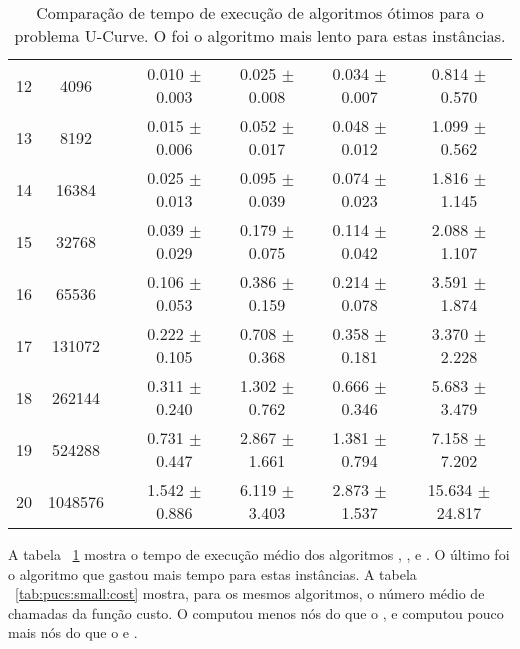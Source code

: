 \begin{table}
\begin{tabular}{cc c cccc}
12 &    4096 &&  0.010 $\pm$ 0.003 & 0.025 $\pm$ 0.008 & 0.034 $\pm$ 0.007 & 0.814 $\pm$ 0.570 \\
13 &    8192 &&  0.015 $\pm$ 0.006 & 0.052 $\pm$ 0.017 & 0.048 $\pm$ 0.012 & 1.099 $\pm$ 0.562 \\
14 &   16384 &&  0.025 $\pm$ 0.013 & 0.095 $\pm$ 0.039 & 0.074 $\pm$ 0.023 & 1.816 $\pm$ 1.145 \\
15 &   32768 &&  0.039 $\pm$ 0.029 & 0.179 $\pm$ 0.075 & 0.114 $\pm$ 0.042 & 2.088 $\pm$ 1.107 \\
16 &   65536 &&  0.106 $\pm$ 0.053 & 0.386 $\pm$ 0.159 & 0.214 $\pm$ 0.078 & 3.591 $\pm$ 1.874 \\
17 &  131072 &&  0.222 $\pm$ 0.105 & 0.708 $\pm$ 0.368 & 0.358 $\pm$ 0.181 & 3.370 $\pm$ 2.228 \\
18 &  262144 &&  0.311 $\pm$ 0.240 & 1.302 $\pm$ 0.762 & 0.666 $\pm$ 0.346 & 5.683 $\pm$ 3.479 \\
19 &  524288 &&  0.731 $\pm$ 0.447 & 2.867 $\pm$ 1.661 & 1.381 $\pm$ 0.794 & 7.158 $\pm$ 7.202 \\
20 & 1048576 &&  1.542 $\pm$ 0.886 & 6.119 $\pm$ 3.403 & 2.873 $\pm$ 1.537 & 15.634 $\pm$ 24.817 \\
\end{tabular}
\caption{Comparação de tempo de execução de algoritmos ótimos para o
problema U-Curve. O  foi o algoritmo mais lento para 
estas instâncias.}
\label{tab:pucs:small:time}
\end{table}


A tabela ~\ref{tab:pucs:small:time} mostra o tempo de execução médio
dos algoritmos , ,  e
. O último foi o algoritmo que gastou mais tempo para 
estas instâncias. A tabela ~\ref{tab:pucs:small:cost} mostra, para os
mesmos algoritmos, o número médio de chamadas da função custo. O
 computou menos nós do que o , e computou
pouco mais nós do que o  e .


